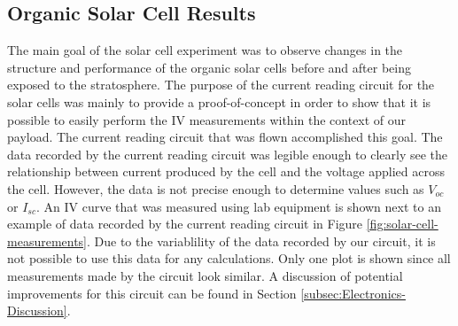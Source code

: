 \subsection{Organic Solar Cell Results}
\label{sec:Solar-Cell-Results}

The main goal of the solar cell experiment was to observe changes in the structure and performance of the organic solar cells before and after being exposed to the stratosphere.
The purpose of the current reading circuit for the solar cells was mainly to provide a proof-of-concept in order to show that it is possible to easily perform the IV measurements within the context of our payload.
The current reading circuit that was flown accomplished this goal.
The data recorded by the current reading circuit was legible enough to clearly see the relationship between current produced by the cell and the voltage applied across the cell.
However, the data is not precise enough to determine values such as $V_{oc}$ or $I_{sc}$.
An IV curve that was measured using lab equipment is shown next to an example of data recorded by the current reading circuit in Figure \ref{fig:solar-cell-measurements}. 
Due to the variablility of the data recorded by our circuit, it is not possible to use this data for any calculations.
Only one plot is shown since all measurements made by the circuit look similar.
A discussion of potential improvements for this circuit can be found in Section \ref{subsec:Electronics-Discussion}.

